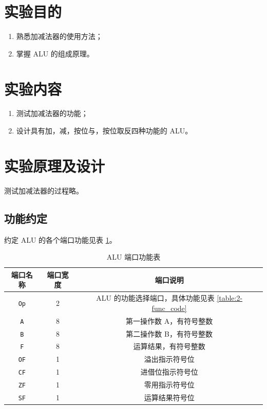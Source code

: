 \section{实验目的}

\begin{enumerate}
    \item 熟悉加减法器的使用方法；
    \item 掌握 ALU 的组成原理。
\end{enumerate}

\section{实验内容}

\begin{enumerate}
    \item 测试加减法器的功能；
    \item 设计具有加，减，按位与，按位取反四种功能的 ALU。
\end{enumerate}

\section{实验原理及设计}

测试加减法器的过程略。

\subsection{功能约定}

约定 ALU 的各个端口功能见表 \ref{table:2-func}。

\begin{table}[h]
    \centering
    \caption{ALU 端口功能表}
    \label{table:2-func}
    \begin{tabular}{|c|c|c|}
        \hline
        端口名称 & 端口宽度 & 端口说明 \\ \hline
        \verb|Op| & 2 & ALU 的功能选择端口，具体功能见表 \ref{table:2-func_code} \\ \hline
        \verb|A| & 8 & 第一操作数 A，有符号整数 \\ \hline
        \verb|B| & 8 & 第二操作数 B，有符号整数 \\ \hline
        \verb|F| & 8 & 运算结果，有符号整数 \\ \hline
        \verb|OF| & 1 & 溢出指示符号位 \\ \hline
        \verb|CF| & 1 & 进借位指示符号位 \\ \hline
        \verb|ZF| & 1 & 零用指示符号位 \\ \hline
        \verb|SF| & 1 & 运算结果符号位 \\ \hline
    \end{tabular}
\end{table}

